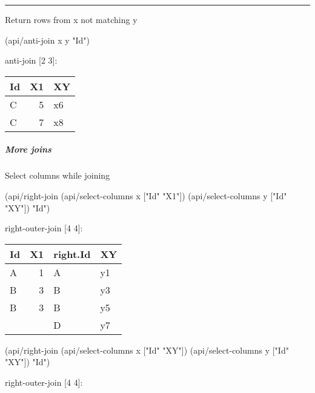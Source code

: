 \documentclass[]{article}
\newenvironment{Shaded}{\begin{snugshade}}{\end{snugshade}}
\newcommand{\StringTok}[1]{\textcolor[rgb]{0.31,0.60,0.02}{#1}}
\newcommand{\NormalTok}[1]{#1}
\let\oldsubparagraph\subparagraph
\renewcommand{\subparagraph}[1]{\oldsubparagraph{#1}\mbox{}}
\begin{document}
\begin{center}\rule{0.5\linewidth}{0.5pt}\end{center}

Return rows from x not matching y

\begin{Shaded}
\begin{Highlighting}[]
\NormalTok{(api/anti-join x y }\StringTok{"Id"}\NormalTok{)}
\end{Highlighting}
\end{Shaded}

anti-join {[}2 3{]}:

\begin{longtable}[]{@{}lrl@{}}
\toprule
Id & X1 & XY\tabularnewline
\midrule
\endhead
C & 5 & x6\tabularnewline
C & 7 & x8\tabularnewline
\bottomrule
\end{longtable}

\subparagraph{More joins}\label{more-joins}

Select columns while joining

\begin{Shaded}
\begin{Highlighting}[]
\NormalTok{(api/right-join (api/select-columns x [}\StringTok{"Id"} \StringTok{"X1"}\NormalTok{])}
\NormalTok{                (api/select-columns y [}\StringTok{"Id"} \StringTok{"XY"}\NormalTok{])}
                \StringTok{"Id"}\NormalTok{)}
\end{Highlighting}
\end{Shaded}

right-outer-join {[}4 4{]}:

\begin{longtable}[]{@{}lrll@{}}
\toprule
Id & X1 & right.Id & XY\tabularnewline
\midrule
\endhead
A & 1 & A & y1\tabularnewline
B & 3 & B & y3\tabularnewline
B & 3 & B & y5\tabularnewline
& & D & y7\tabularnewline
\bottomrule
\end{longtable}

\begin{Shaded}
\begin{Highlighting}[]
\NormalTok{(api/right-join (api/select-columns x [}\StringTok{"Id"} \StringTok{"XY"}\NormalTok{])}
\NormalTok{                (api/select-columns y [}\StringTok{"Id"} \StringTok{"XY"}\NormalTok{])}
                \StringTok{"Id"}\NormalTok{)}
\end{Highlighting}
\end{Shaded}

right-outer-join {[}4 4{]}:
\end{document}
